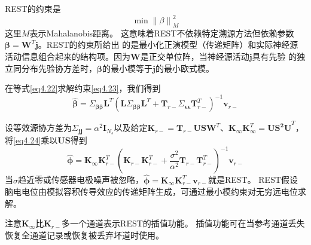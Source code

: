 REST的约束是
\begin{equation}\label{eq4.23}
\min{\lVert{\beta}\rVert}_M^2
\end{equation}
这里$M$表示Mahalanobis距离。 这意味着REST不依赖特定溯源方法但依赖参数$\mathbf{\beta}=\mathbf{W}^T\mathbf{j}$。REST的约束所给出
的是最小化正演模型（传递矩阵）和实际神经源活动信息组合起来的结构项。因为$\mathbf{W}$是正交单位阵，当神经源活动$\mathbf{j}$具有先验
的独立同分布先验协方差时，$\mathbf{\beta}$的最小模等于$\mathbf{j}$的最小欧式模。

在等式\eqref{eq4.22}求解约束\eqref{eq4.23}，我们得到
\begin{equation}\label{eq4.24}
\hat{\mathbf{\beta}}=\Sigma_{\mathbf{\beta\beta}}\mathbf{L}^T(\mathbf{L}\Sigma_\mathbf{\beta\beta}\mathbf{L}^T+\mathbf{T}_{r-}\Sigma_{\mathbf{\epsilon\epsilon}}\mathbf{T}_{r-}^T)^{-1}\mathbf{v}_{r-}
\end{equation}

设等效源协方差为$\Sigma_\mathbf{jj}=\alpha^2\mathbf{I}_{N_s}$以及给定$\mathbf{K}_{r-}=\mathbf{T}_{r-}\mathbf{USW}^T$、$\mathbf{K}_{\infty}\mathbf{K}_{\infty}^T=\mathbf{US^2U}^T$，将\eqref{eq4.24}乘以$\mathbf{US}$得到
\begin{equation*}
\hat{\mathbf{\phi}}=\mathbf{K}_{\infty}\mathbf{K}_{r-}^T(\mathbf{K}_{r-}\mathbf{K}_{r-}^T+\frac{\sigma^2}{\alpha^2}\mathbf{T}_{r-}\mathbf{T}_{r-}^T)^{-1}\mathbf{v}_{r-}
\end{equation*}
当$\sigma$趋近零或传感器电极噪声被忽略，$\hat{\mathbf{\phi}}=\mathbf{K}_{\infty}\mathbf{K}_{r-}^T\mathbf{v}_{r-}$就是REST。
REST假设脑电电位由模拟容积传导效应的传递矩阵生成，可通过最小模约束对无穷远电位求解。

注意$\mathbf{K}_{\infty}$比$\mathbf{K}_{r-}$多一个通道表示REST的插值功能。 插值功能可在当参考通道丢失恢复全通道记录或恢复被丢弃坏道时使用。

